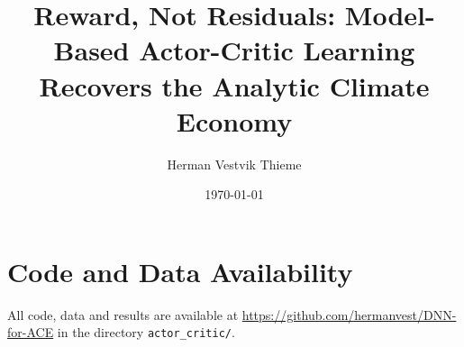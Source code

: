 \documentclass[11pt]{article}
\title{Reward, Not Residuals: Model-Based Actor-Critic Learning\\ Recovers the Analytic Climate Economy}
\author{Herman Vestvik Thieme}
\date{\today}
\begin{document}
\maketitle

\begin{abstract}

\end{abstract}










\section*{Code and Data Availability}
All code, data and results are available at \url{https://github.com/hermanvest/DNN-for-ACE} in the directory \texttt{actor\_critic/}.

\printbibliography
\end{document}
